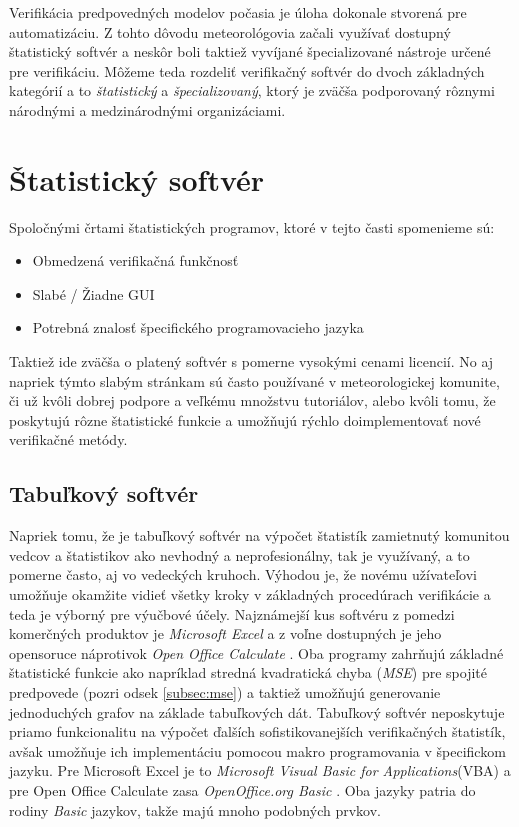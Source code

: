 
Verifikácia predpovedných modelov počasia je úloha dokonale stvorená pre automatizáciu. 
Z tohto dôvodu meteorológovia začali využívať dostupný štatistický softvér 
a neskôr boli taktiež vyvíjané špecializované nástroje určené pre verifikáciu.
Môžeme teda rozdeliť verifikačný softvér do dvoch základných kategórií a to \textit{štatistický} a \textit{špecializovaný}, ktorý je zväčša podporovaný rôznymi národnými a medzinárodnými organizáciami.

\section{Štatistický softvér}

Spoločnými črtami štatistických programov, ktoré v tejto časti spomenieme sú: 
\begin{singlespacing}
\begin{itemize} 
	\item Obmedzená verifikačná funkčnosť
	\item Slabé / Žiadne GUI
	\item Potrebná znalosť špecifického programovacieho jazyka
\end{itemize}
\end{singlespacing}
Taktiež ide zväčša o platený softvér s pomerne vysokými cenami licencií. No aj napriek týmto slabým stránkam sú často používané v meteorologickej komunite, či už kvôli dobrej podpore a veľkému množstvu tutoriálov, alebo kvôli tomu, že poskytujú rôzne štatistické funkcie a umožňujú rýchlo doimplementovať nové verifikačné metódy.


\subsection{Tabuľkový softvér}
Napriek tomu, že je tabuľkový softvér na výpočet štatistík zamietnutý komunitou vedcov a štatistikov ako nevhodný a neprofesionálny, tak je využívaný, a to pomerne často, aj vo vedeckých kruhoch. 
Výhodou je, že novému užívateľovi umožňuje okamžite vidieť všetky kroky v základných procedúrach verifikácie a teda je výborný pre výučbové účely. \cite{VerifSoft} 
Najznámejší kus softvéru z pomedzi komerčných produktov je \textit{Microsoft Excel} \cite{Excel} a z voľne dostupných je jeho opensoruce náprotivok \textit{Open Office Calculate} \cite{OpenOfficeCalc}. Oba programy zahrňujú základné štatistické funkcie ako napríklad stredná kvadratická chyba (\textit{MSE}) pre spojité predpovede (pozri odsek \ref{subsec:mse}) a taktiež umožňujú generovanie jednoduchých grafov na základe tabuľkových dát. Tabuľkový softvér neposkytuje priamo funkcionalitu na výpočet ďalších sofistikovanejších verifikačných štatistík, avšak umožňuje ich implementáciu pomocou makro programovania v špecifickom jazyku. Pre Microsoft Excel je to \textit{Microsoft Visual Basic for Applications}(VBA) \cite{VBA} a pre Open Office Calculate zasa \textit{OpenOffice.org Basic} \cite{OpenOfficeBasic}. Oba jazyky patria do rodiny \textit{Basic} jazykov, takže majú mnoho podobných prvkov.  


